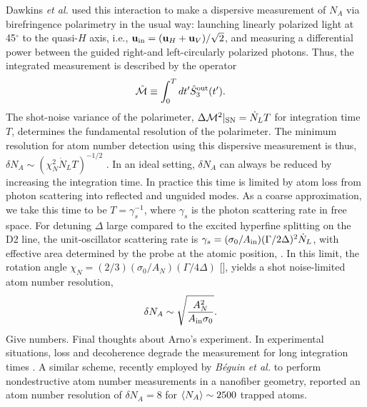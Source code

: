 \documentclass[preprint, aps,pra,onecolumn]{revtex4-1} %
\newcommand{\inp}{{\rm in}}
\newcommand{\shotnoise}{\Delta \mathcal{M}^2 |_{\rm SN}}
\newcommand{\chiN}{\chi_{N}}
\newcommand{\Abir}{A_N}
\newcommand{\comment}[1]{{\color{Maroon} #1}}
\begin{document}
Dawkins {\em et al.} \cite{dawkins_dispersive_2011} used this interaction to make a dispersive measurement of $N_A$ via birefringence polarimetry in the usual way: launching linearly polarized light at 45$^\circ$ to the quasi-$H$ axis, i.e., $\mbf{u}_\inp = (\mbf{u}_H + \mbf{u}_V )/\sqrt{2}$, and measuring  a differential power between the guided right-and left-circularly polarized photons. 
Thus, the integrated measurement is described by the operator
\begin{align} \label{Eq::MeasOpAtomCounting}
		\hat{\mathcal{M}} & \equiv \int_0^T dt' \hat{S}^{\rm out}_3(t').
\end{align} 
The shot-noise variance of the polarimeter, $\shotnoise =  \dot{N}_L T$ for integration time $T$,  determines the fundamental resolution of the polarimeter.  
The minimum resolution for atom number detection using this dispersive measurement is thus, $\delta N_A \sim ( \chiN^2 \dot{N}_L T)^{-1/2}$ \cite{smith_faraday_2003}.  
In an ideal setting, $\delta N_A$ can always be reduced by increasing the integration time. In practice this time is limited by atom loss from photon scattering into reflected and unguided modes. 
As a coarse approximation, we take this time to be $T=\gamma_s^{-1}$, where $\gamma_s$ is the photon scattering rate in free space.  
For detuning $\Delta$ large compared to the excited hyperfine splitting on the D2 line, the unit-oscillator scattering rate is $\gamma_s =(\sigma_0 /A_{\rm in})(\Gamma/2 \Delta)^2 \dot{N}_L $, with effective area determined by the probe at the atomic position, .  
In this limit, the rotation angle $\chiN = (2/3) (\sigma_0/\Abir)(\Gamma/4\Delta)$ [], yields a shot noise-limited atom number resolution, 
	\begin{align} \label{Eq::AtomNumberResolution}
		\delta N_A  &\sim \sqrt {\frac{\Abir^2}{A_{\rm in} \sigma_0}}.
	\end{align}
\comment{Give numbers. Final thoughts about Arno's experiment.} 
In experimental situations, loss and decoherence degrade the measurement for long integration times \cite{dawkins_dispersive_2011, zhang_collective_2012}. 
A similar scheme, recently employed by \emph{B\'{e}guin et al.} \cite{beguin_generation_2014} to perform nondestructive atom number measurements in a nanofiber geometry,  reported an atom number resolution of $\delta N_A = 8$ for $\langle{N_A}\rangle\sim2500$ trapped atoms.



\end{document}
